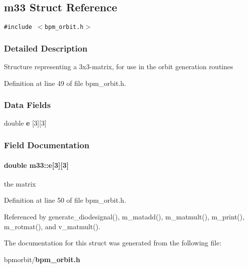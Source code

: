 \subsection{m33 Struct Reference}
\label{structm33}
{\tt \#include $<$bpm\_\-orbit.h$>$}



\subsubsection{Detailed Description}
Structure representing a 3x3-matrix, for use in the orbit generation routines 

Definition at line 49 of file bpm\_\-orbit.h.\subsubsection*{Data Fields}
\begin{CompactItemize}
\item 
double {\bf e} [3][3]
\end{CompactItemize}


\subsubsection{Field Documentation}
\paragraph[e]{\setlength{\rightskip}{0pt plus 5cm}double {\bf m33::e}[3][3]}\hfill\label{structm33_ff2fb431dec7f3e99fa12f760e855651}


the matrix 

Definition at line 50 of file bpm\_\-orbit.h.

Referenced by generate\_\-diodesignal(), m\_\-matadd(), m\_\-matmult(), m\_\-print(), m\_\-rotmat(), and v\_\-matmult().

The documentation for this struct was generated from the following file:\begin{CompactItemize}
\item 
bpmorbit/{\bf bpm\_\-orbit.h}\end{CompactItemize}
